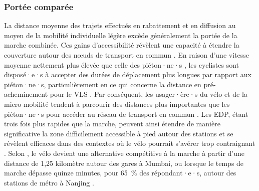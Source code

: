 \begin{refsegment}
\subsubsection*{Portée comparée
    \label{chap2:portee-comparee}
    }
    
La distance moyenne des trajets effectués en rabattement et en diffusion au moyen de la mobilité individuelle légère excède généralement la portée de la marche combinée. Ces gains d'accessibilité révèlent une capacité à étendre la couverture autour des nœuds de transport en commun \textcolor{blue}{\autocite[4]{advani_bicycle_2006}}. En raison d'une vitesse moyenne nettement plus élevée que celle des piéton·ne·s \textcolor{blue}{\autocite[42]{lee_strategies_2010}}, les cyclistes sont disposé·e·s à accepter des durées de déplacement plus longues par rapport aux piéton·ne·s, particulièrement en ce qui concerne la distance en pré-acheminement pour le \acrshort{VLS} \textcolor{blue}{\autocite[114]{bachand-marleau_much-anticipated_2011}}. Par conséquent, les usager·ère·s du vélo et de la micro-mobilité tendent à parcourir des distances plus importantes que les piéton·ne·s pour accéder au réseau de transport en commun \textcolor{blue}{\autocites[69-70]{flamm_determinants_2013}[832]{ton_understanding_2020}}. Les \acrshort{EDP}, étant trois fois plus rapides que la marche, peuvent ainsi étendre de manière significative la zone difficilement accessible à pied autour des stations et se révèlent efficaces dans des contextes où le vélo pourrait s'avérer trop contraignant \textcolor{blue}{\autocite[4]{kostrzewska_towards_2017}}. Selon \textcolor{blue}{\textcite[2]{rastogi_willingness_2010}}, le vélo devient une alternative compétitive à la marche à partir d'une distance de 1,25 kilomètre autour des gares à Mumbai, ou lorsque le temps de marche dépasse quinze minutes, pour 65~\% des répondant·e·s, autour des stations de métro à Nanjing \textcolor{blue}{\autocite[133]{chen_determinants_2012}}.%


\end{refsegment}
